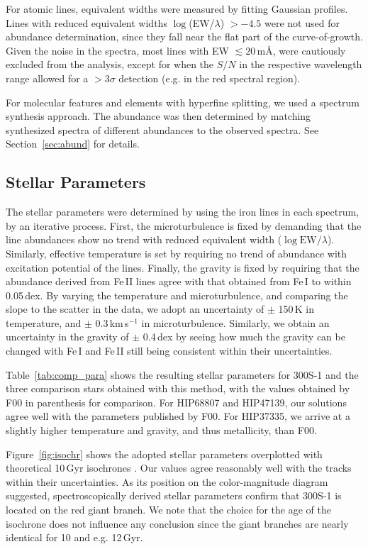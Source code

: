 \documentclass{emulateapj}
\begin{document}
For atomic lines, equivalent widths were measured by fitting Gaussian
profiles. Lines with reduced equivalent widths $\log$(EW/$\lambda$) $>
-4.5$ were not used for abundance determination, since they fall near
the flat part of the curve-of-growth. Given the noise in the spectra,
most lines with EW $\lesssim 20$\,m{\AA}, were cautiously excluded
from the analysis, except for when the $S/N$ in the respective
wavelength range allowed for a $>3\sigma$ detection (e.g. in the red
spectral region).

For molecular features and elements with hyperfine splitting, we used
a spectrum synthesis approach. The abundance was then determined by
matching synthesized spectra of different abundances to the observed
spectra. See Section~\ref{sec:abund} for details.


\subsection{Stellar Parameters}
\label{sec:stpar}
The stellar parameters were determined by using the iron lines in each
spectrum, by an iterative process. First, the microturbulence is fixed
by demanding that the line abundances show no trend with reduced
equivalent width ($\log \mbox{EW}/\lambda$). Similarly, effective
temperature is set by requiring no trend of abundance with excitation
potential of the lines. Finally, the gravity is fixed by requiring
that the abundance derived from Fe\,II lines agree with that obtained
from Fe\,I to within 0.05\,dex. By varying the temperature and
microturbulence, and comparing the slope to the scatter in the data,
we adopt an uncertainty of $\pm$ 150\,K in temperature, and $\pm$
0.3\,km\,s$^{-1}$ in microturbulence. Similarly, we obtain an
uncertainty in the gravity of $\pm$ 0.4\,dex by seeing how much the
gravity can be changed with Fe\,I and Fe\,II still being consistent
within their uncertainties.


Table~\ref{tab:comp_para} shows the resulting stellar parameters for
300S-1 and the three comparison stars obtained with this method, with
the values obtained by F00 in parenthesis for comparison. For HIP68807
and HIP47139, our solutions agree well with the parameters published
by F00. For HIP37335, we arrive at a slightly higher temperature and
gravity, and thus metallicity, than F00.


Figure~\ref{fig:isochr} shows the adopted stellar parameters
overplotted with theoretical 10\,Gyr isochrones \citep{Kim2002}.  Our
values agree reasonably well with the tracks within their
uncertainties.  As its position on the color-magnitude diagram
suggested, spectroscopically derived stellar parameters confirm that
300S-1 is located on the red giant branch. We note that the choice for
the age of the isochrone does not influence any conclusion since the
giant branches are nearly identical for 10 and e.g. 12\,Gyr.
\end{document}
